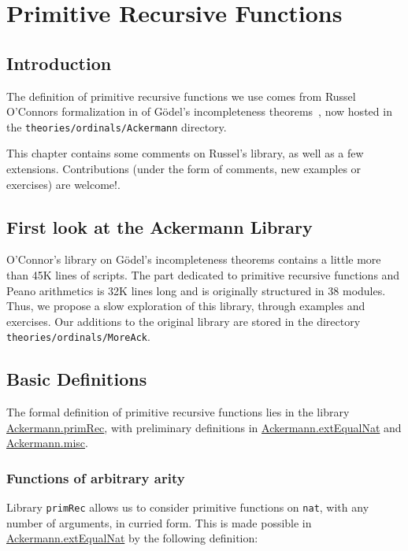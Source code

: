 \chapter{Primitive Recursive Functions}

\section{Introduction}
The definition of primitive recursive functions we use comes
from Russel O'Connors formalization in \coq{} of
G\"odel's incompleteness theorems~\cite{OConnor05}, now hosted in
the \texttt{theories/ordinals/Ackermann} directory.

This chapter contains some comments on Russel's library, as well as a few extensions.
Contributions (under the form of comments, new examples or exercises) are welcome!. 

\section{First look at the Ackermann Library}

O'Connor's library on Gödel's incompleteness theorems contains a little more 
than 45K lines of scripts. The part dedicated to primitive recursive functions and Peano arithmetics is 32K lines long and is originally structured in 38 modules.
Thus, we propose a slow exploration of this library, through examples and exercises. Our additions to the original library 
are stored in the directory \texttt{theories/ordinals/MoreAck}.

\section{Basic Definitions}

The formal definition of primitive recursive functions lies in the library
\href{../theories/html/hydras.Ackermann.primRec.html}{Ackermann.primRec},
with preliminary definitions in 
\href{../theories/html/hydras.Ackermann.extEqualNat.html}{Ackermann.extEqualNat}
and
\href{../theories/html/hydras.Ackermann.misc.html}{Ackermann.misc}.

\subsection{Functions of arbitrary arity}

Library \texttt{primRec} allows us to consider primitive functions on \texttt{nat}, with any number of arguments, in 
curried form. This is made possible in 
\href{../theories/html/hydras.Ackermann.extEqualNat.html}{Ackermann.extEqualNat} by the following definition:

